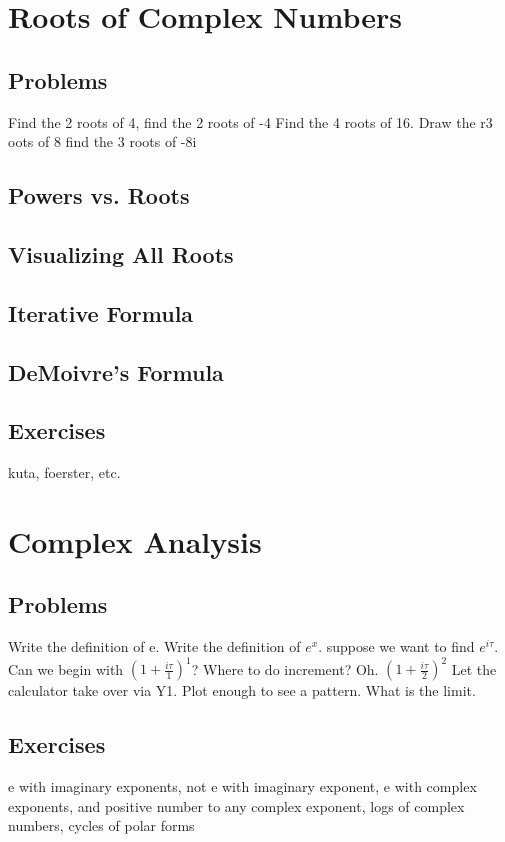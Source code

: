 \newpage
\section{Roots of Complex Numbers}
\subsection{Problems}
Find the 2 roots of 4, find the 2 roots of -4
Find the 4 roots of 16.  Draw the r3 oots of 8
find the 3 roots of -8i
\newpage
\subsection{Powers vs. Roots}
\subsection{Visualizing All Roots}
\subsection{Iterative Formula}
\subsection{DeMoivre's Formula}
\newpage
\subsection{Exercises}
kuta, foerster, etc.


\newpage
\section{Complex Analysis}
\subsection{Problems}
Write the definition of e.  Write the definition of $e^x$.  suppose we want to find
$e^{i\tau}$.  Can we begin with $(1+\frac{i\tau}{1})^1$?  Where to do increment?
Oh.  $(1+\frac{i\tau}{2})^2$  Let the calculator take over via Y1.  Plot enough to see a
pattern.  What is the limit. 
\newpage

\newpage
\subsection{Exercises}
e with imaginary exponents,  not e with imaginary exponent, 
e with complex exponents, and positive number to any complex exponent,
logs of complex numbers, cycles of polar forms




